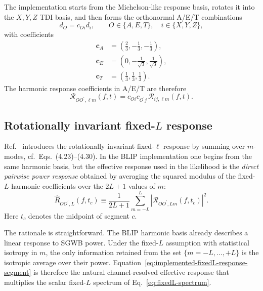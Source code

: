\documentclass[11pt]{article}
\newcommand{\Rlm}{\mathcal{R}}
\newcommand{\OO}{OO^\prime}
\newcommand{\vect}[1]{\bm{#1}}
\begin{document}
The implementation starts from the Michelson-like response basis, rotates it into the $X,Y,Z$ TDI basis, and then forms the orthonormal A/E/T combinations
\begin{equation}
  d_O = c_{Oi} d_i,
  \qquad O\in\{A,E,T\},\quad i\in\{X,Y,Z\},
\end{equation}
with coefficients
\begin{align}
  \vect{c}_{A} &= \left(\frac{2}{3},-\frac{1}{3},-\frac{1}{3}\right),\\
  \vect{c}_{E} &= \left(0,-\frac{1}{\sqrt{3}},\frac{1}{\sqrt{3}}\right),\\
  \vect{c}_{T} &= \left(\frac{1}{3},\frac{1}{3},\frac{1}{3}\right).
  \label{eq:aet-transform}
\end{align}
The harmonic response coefficients in A/E/T are therefore
\begin{equation}
  \Rlm_{OO^\prime,\ell m}(f,t)
  =
  c_{Oi} c_{O^\prime j}\,
  \Rlm_{ij,\ell m}(f,t).
  \label{eq:aet-response-transform}
\end{equation}

\subsection{Rotationally invariant fixed-$L$ response}

Ref.~\cite{LISAAnisotropyPaper} introduces the rotationally invariant fixed-$\ell$ response by summing over $m$-modes, cf.\ Eqs.~(4.23)--(4.30).  In the BLIP implementation one begins from the same harmonic basis, but the effective response used in the likelihood is the \emph{direct pairwise power response} obtained by averaging the squared modulus of the fixed-$L$ harmonic coefficients over the $2L+1$ values of $m$:
\begin{equation}
  \widehat{R}_{\OO,L}(f,t_c)
  \equiv
  \frac{1}{2L+1}
  \sum_{m=-L}^{L}
  \left|
    \Rlm_{\OO,Lm}(f,t_c)
  \right|^2 .
  \label{eq:implemented-fixedL-response-segment}
\end{equation}
Here $t_c$ denotes the midpoint of segment $c$.

The rationale is straightforward.  The BLIP harmonic basis already describes a linear response to SGWB power.  Under the fixed-$L$ assumption with statistical isotropy in $m$, the only information retained from the set $\{m=-L,\ldots,+L\}$ is the isotropic average over their power.  Equation~\eqref{eq:implemented-fixedL-response-segment} is therefore the natural channel-resolved effective response that multiplies the scalar fixed-$L$ spectrum of Eq.~\eqref{eq:fixedL-spectrum}.
\end{document}
